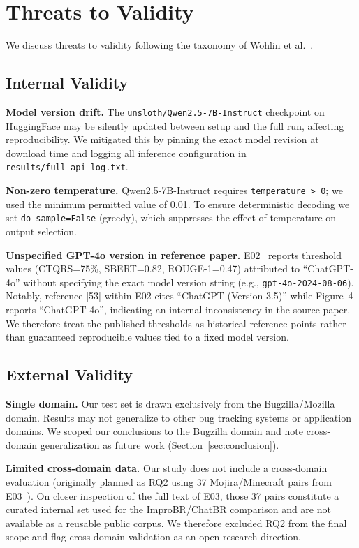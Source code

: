 \section{Threats to Validity}
\label{sec:threats}

We discuss threats to validity following the taxonomy of Wohlin et al.~\cite{wohlin2012experimentation}.

\subsection{Internal Validity}

\textbf{Model version drift.}
The \texttt{unsloth/Qwen2.5-7B-Instruct} checkpoint on HuggingFace
may be silently updated between setup and the full run, affecting
reproducibility. We mitigated this by pinning the exact model
revision at download time and logging all inference configuration
in \texttt{results/full\_api\_log.txt}.

\textbf{Non-zero temperature.}
Qwen2.5-7B-Instruct requires \texttt{temperature~>~0}; we used the
minimum permitted value of 0.01. To ensure deterministic decoding
we set \texttt{do\_sample=False} (greedy), which suppresses the
effect of temperature on output selection.

\textbf{Unspecified GPT-4o version in reference paper.}
E02~\cite{acharya2025bugquality} reports threshold values
(CTQRS=75\%, SBERT=0.82, ROUGE-1=0.47) attributed to
``ChatGPT-4o'' without specifying the exact model version string
(e.g., \texttt{gpt-4o-2024-08-06}). Notably, reference [53] within
E02 cites ``ChatGPT (Version 3.5)'' while Figure~4 reports
``ChatGPT 4o'', indicating an internal inconsistency in the source
paper. We therefore treat the published thresholds as historical
reference points rather than guaranteed reproducible values tied
to a fixed model version.

\subsection{External Validity}

\textbf{Single domain.}
Our test set is drawn exclusively from the Bugzilla/Mozilla domain.
Results may not generalize to other bug tracking systems or
application domains. We scoped our conclusions to the Bugzilla
domain and note cross-domain generalization as future work
(Section~\ref{sec:conclusion}).

\textbf{Limited cross-domain data.}
Our study does not include a cross-domain evaluation (originally
planned as RQ2 using 37 Mojira/Minecraft pairs from
E03~\cite{akyol2026improbr}). On closer inspection of the
full text of E03, those 37 pairs constitute a curated internal
set used for the ImproBR/ChatBR comparison and are not
available as a reusable public corpus. We therefore excluded RQ2
from the final scope and flag cross-domain validation as an open
research direction.

